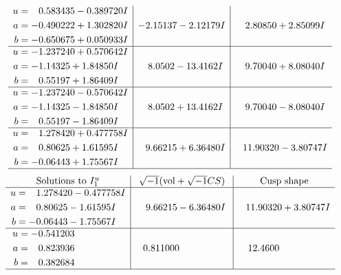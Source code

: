 \documentclass[1p]{elsarticle_modified}
\theoremstyle{definition}
\newcommand{\I}{\sqrt{-1}}
\begin{document}
$$\begin{array}{c|c|c}
\begin{aligned}
u &= \phantom{-}0.583435 - 0.389720 I \\
a &= -0.490222 + 1.302820 I \\
b &= -0.650675 + 0.050933 I\end{aligned}
 & -2.15137 - 2.12179 I & \phantom{-}2.80850 + 2.85099 I \\ \hline\begin{aligned}
u &= -1.237240 + 0.570642 I \\
a &= -1.14325 + 1.84850 I \\
b &= \phantom{-}0.55197 + 1.86409 I\end{aligned}
 & \phantom{-}8.0502 - 13.4162 I & \phantom{-}9.70040 + 8.08040 I \\ \hline\begin{aligned}
u &= -1.237240 - 0.570642 I \\
a &= -1.14325 - 1.84850 I \\
b &= \phantom{-}0.55197 - 1.86409 I\end{aligned}
 & \phantom{-}8.0502 + 13.4162 I & \phantom{-}9.70040 - 8.08040 I \\ \hline\begin{aligned}
u &= \phantom{-}1.278420 + 0.477758 I \\
a &= \phantom{-}0.80625 + 1.61595 I \\
b &= -0.06443 + 1.75567 I\end{aligned}
 & \phantom{-}9.66215 + 6.36480 I & \phantom{-}11.90320 - 3.80747 I\\
 \hline 
 \end{array}$$\newpage$$\begin{array}{c|c|c}  
\text{Solutions to }I^u_{1}& \I (\text{vol} + \sqrt{-1}CS) & \text{Cusp shape}\\
 \hline 
\begin{aligned}
u &= \phantom{-}1.278420 - 0.477758 I \\
a &= \phantom{-}0.80625 - 1.61595 I \\
b &= -0.06443 - 1.75567 I\end{aligned}
 & \phantom{-}9.66215 - 6.36480 I & \phantom{-}11.90320 + 3.80747 I \\ \hline\begin{aligned}
u &= -0.541203\phantom{ +0.000000I} \\
a &= \phantom{-}0.823936\phantom{ +0.000000I} \\
b &= \phantom{-}0.382684\phantom{ +0.000000I}\end{aligned}
 & \phantom{-}0.811000\phantom{ +0.000000I} & \phantom{-}12.4600\phantom{ +0.000000I}\\
 \hline 
 \end{array}$$\newpage\newpage\renewcommand{\arraystretch}{1}
\end{document}
